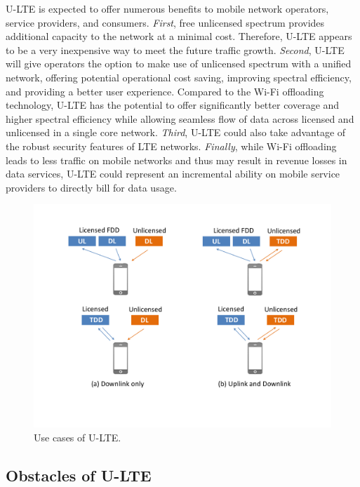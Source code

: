 \documentclass[12pt,onecolumn]{article}
\begin{document}
\noindent U-LTE is expected to offer numerous benefits to mobile network operators, service providers, and consumers. \textit{First}, free unlicensed spectrum provides additional capacity to the network at a minimal cost. Therefore, U-LTE appears to be a very inexpensive way to meet the future traffic growth. \textit{Second}, U-LTE will give operators the option to make use of unlicensed spectrum with a unified network, offering potential operational cost saving, improving spectral efficiency, and providing a better user experience. Compared to the Wi-Fi offloading technology, U-LTE has the potential to offer significantly better coverage and higher spectral efficiency while allowing seamless flow of data across licensed and unlicensed in a single core network. \textit{Third}, U-LTE could also take advantage of the robust security features of LTE networks. \textit{Finally}, while Wi-Fi offloading leads to less traffic on mobile networks and thus may result in revenue losses in data services, U-LTE could represent an incremental ability on mobile service providers to directly bill for data usage.

\begin{figure}[!t]
\centering
\includegraphics[width=0.7\columnwidth]{figures2/U-LTE-use_model}
\caption{Use cases of U-LTE.}
\label{figs:U-LTE-use_model}
\end{figure}

\subsection{Obstacles of U-LTE}
\end{document}
